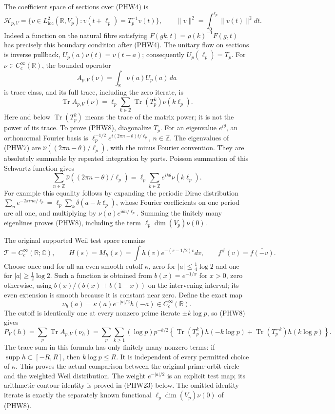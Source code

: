 \documentclass[
  10pt,
  a4paper,
]{article}
\begin{document}
The coefficient space of sections over (PHW4) is \[
\mathcal H_{p,V}=
\{v\in L^2_{\mathrm{loc}}(\mathbb R,V_p):
v(t+\ell_p)=T_p^{-1}v(t)\},
\qquad
\|v\|^2=\int_0^{\ell_p}\|v(t)\|^2dt.
\tag{PHW6}
\] Indeed a function on the natural fibre satisfying
\(F(gk,t)=\rho(k)^{-1}F(g,t)\) has precisely this boundary condition
after (PHW4). The unitary flow on sections is inverse pullback,
\(U_p(a)v(t)=v(t-a)\); consequently \(U_p(\ell_p)=T_p\). For
\(\nu\in C_c^\infty(\mathbb R)\), the bounded operator \[
A_{p,V}(\nu)=\int_{\mathbb R}\nu(a)U_p(a)\,da
\tag{PHW7}
\] is trace class, and its full trace, including the zero iterate, is \[
\boxed{
\operatorname{Tr}A_{p,V}(\nu)
=\ell_p\sum_{k\in\mathbb Z}\operatorname{Tr}(T_p^k)\nu(k\ell_p).
}
\tag{PHW8}
\] Here and below \(\operatorname{Tr}(T_p^k)\) means the trace of the
matrix power; it is not the power of its trace. To prove (PHW8),
diagonalize \(T_p\). For an eigenvalue \(e^{i\theta}\), an orthonormal
Fourier basis is \(\ell_p^{-1/2}e^{i(2\pi n-\theta)t/\ell_p}\),
\(n\in\mathbb Z\). The eigenvalues of (PHW7) are
\(\widehat\nu((2\pi n-\theta)/\ell_p)\), with the minus Fourier
convention. They are absolutely summable by repeated integration by
parts. Poisson summation of this Schwartz function gives \[
\sum_{n\in\mathbb Z}\widehat\nu((2\pi n-\theta)/\ell_p)
=\ell_p\sum_{k\in\mathbb Z}e^{ik\theta}\nu(k\ell_p).
\tag{PHW9}
\] For example this equality follows by expanding the periodic Dirac
distribution
\(\sum_n e^{-2\pi i n a/\ell_p}=\ell_p\sum_k\delta(a-k\ell_p)\), whose
Fourier coefficients on one period are all one, and multiplying by
\(\nu(a)e^{i\theta a/\ell_p}\). Summing the finitely many eigenlines
proves (PHW8), including the term \(\ell_p\dim(V_p)\nu(0)\).

The original supported Weil test space remains \[
\mathcal T=C_c^\infty(\mathbb R;\mathbb C),\qquad
H(s)=M_h(s)=\int h(v)e^{-(s-1/2)v}dv,
\qquad f^\#(v)=\overline{f(-v)}.
\tag{PHW10}
\] Choose once and for all an even smooth cutoff \(\kappa\), zero for
\(|a|\le\tfrac14\log2\) and one for \(|a|\ge\tfrac12\log2\). Such a
function is obtained from \(b(x)=e^{-1/x}\) for \(x>0\), zero otherwise,
using \(b(x)/(b(x)+b(1-x))\) on the intervening interval; its even
extension is smooth because it is constant near zero. Define the exact
map \[
\nu_h(a)=\kappa(a)e^{-|a|/2}h(-a)\in C_c^\infty(\mathbb R).
\tag{PHW11}
\] The cutoff is identically one at every nonzero prime iterate
\(\pm k\log p\), so (PHW8) gives \[
\boxed{
P_V(h)=\sum_p\operatorname{Tr}A_{p,V}(\nu_h)
=\sum_p\sum_{k\ge1}(\log p)p^{-k/2}
\left\{\operatorname{Tr}(T_p^k)h(-k\log p)
+\operatorname{Tr}(T_p^{-k})h(k\log p)\right\}.
}
\tag{PHW12}
\] The trace sum in this formula has only finitely many nonzero terms:
if \(\operatorname{supp}h\subset[-R,R]\), then \(k\log p\le R\). It is
independent of every permitted choice of \(\kappa\). This proves the
actual comparison between the original prime-orbit circle and the
weighted Weil distribution. The weight \(e^{-|a|/2}\) is an explicit
test map; its arithmetic contour identity is proved in (PHW23) below.
The omitted identity iterate is exactly the separately known functional
\(\ell_p\dim(V_p)\nu(0)\) of (PHW8).
\end{document}
